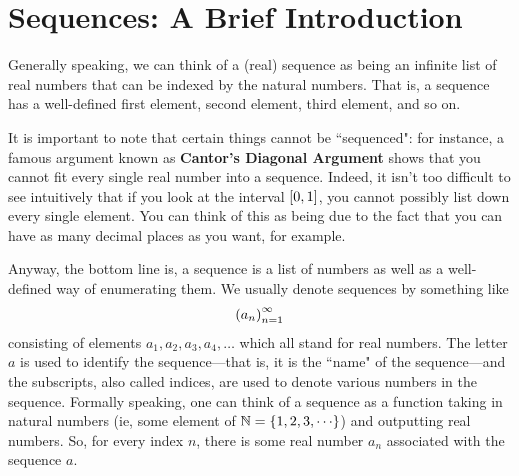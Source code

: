 \section{Sequences: A Brief Introduction}

Generally speaking, we can think of a (real) sequence as being an infinite list of real numbers that can be indexed by the natural numbers. That is, a sequence has a well-defined first element, second element, third element, and so on.

It is important to note that certain things cannot be ``sequenced": for instance, a famous argument known as \textbf{Cantor's Diagonal Argument} shows that you cannot fit every single real number into a sequence. Indeed, it isn't too difficult to see intuitively that if you look at the interval $\left[ 0,1 \right]$, you cannot possibly list down every single element. You can think of this as being due to the fact that you can have as many decimal places as you want, for example.

Anyway, the bottom line is, a sequence is a list of numbers as well as a well-defined way of enumerating them. We usually denote sequences by something like
\begin{align*}
    \left( a_n \right)_{n=1}^{\infty}
\end{align*}
consisting of elements $a_1, a_2, a_3, a_4, \ldots$ which all stand for real numbers. The letter $a$ is used to identify the sequence---that is, it is the ``name" of the sequence---and the subscripts, also called indices, are used to denote various numbers in the sequence. Formally speaking, one can think of a sequence as a function taking in natural numbers (ie, some element of $\N = \set{1, 2, 3, \cdots}$) and outputting real numbers. So, for every index $n$, there is some real number $a_n$ associated with the sequence $a$.



